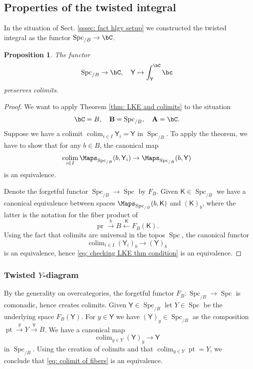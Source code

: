 \documentclass[10pt]{amsart}
\newcommand{\sssec}{\subsubsection}
\newtheorem{prop}[subsubsection]{Proposition}
\theoremstyle{remark}
\newcommand{\on}{\operatorname}
\newcommand{\Spc}{\on{Spc}}
\DeclareMathOperator{\pr}{pr}
\DeclareMathOperator{\colim}{colim}
\newcommand{\bA}{\mathbf{A}}
\newcommand{\bB}{\mathbf{B}}
\newcommand{\pt}{\on{pt}}
\newcommand{\sfY}{\mathsf{Y}}
\begin{document}
\subsection{Properties of the twisted integral}
In the situation of Sect. \ref{sssec: fact hlgy setup} we constructed the twisted integral as the functor $\Spc_{/B}\rightarrow \bC$.
\begin{prop}\label{prop: twfact colim}
    The functor 
    \begin{equation}\label{eq: twfact functor}
\Spc_{/B}\rightarrow \bC,\quad \sfY\mapsto \int^{\bC}_{\sfY}\bc
    \end{equation}
    preserves colimits.
\end{prop}
\begin{proof}
    We want to apply Theorem \ref{thm: LKE and colimits} to the situation
    \[\bC=B,\quad \bB=\Spc_{/B},\quad \bA=\bC.\]
    Suppose we have a colimit $\colim_{i\in I}\sfY_i =\sfY$ in $\Spc_{/B}$. To apply the theorem, we have to show that for any $b\in B$, the canonical map
    \begin{equation}\label{eq: checking LKE thm condition}
        \colim_{i\in I}\Maps_{\Spc_{/B}}(b,\sfY_i)\rightarrow \Maps_{\Spc_{/B}}(b,\sfY)
    \end{equation}
     is an equivalence. 
     \medskip

     Denote the forgetful functor $\Spc_{/B}\rightarrow \Spc$ by $F_B$.
     Given $\mathsf{K}\in \Spc_{/B}$ we have a canonical equivalence between spaces $\Maps_{\Spc_{/ B}}(b, \mathsf{K})$ and $(\mathsf{K})_b$, where the latter is the notation for the fiber product of
     \[\pr\xrightarrow{b} B\xleftarrow{\mathsf{K}}F_B(\mathsf{K}).\]
     Using the fact that colimits are universal in the topos $\Spc$, the canonical functor
     \[\colim_{i\in I}(\sfY_i)_b\rightarrow (\sfY)_b\]
     is an equivalence, hence \eqref{eq: checking LKE thm condition} is an equivalence. 
\end{proof}

\sssec{Twisted $Y$-diagram}
By the generality on overcategories, the forgetful functor $F_B:\Spc_{/B}\rightarrow \Spc$ is comonadic, hence creates colimits. Given $\sfY\in\Spc_{/B}$ let $Y\in\Spc$ be the underlying space $F_B(\sfY)$. For $y\in \sfY$ we have $(\sfY)_y\in\Spc_{/B}$ as the composition $\pt\xrightarrow{y}Y\xrightarrow{\sfY} B$.
We have a canonical map 
\begin{equation}\label{eq: colimit of fibers}
    \colim_{y\in Y}(\sfY)_y\rightarrow \sfY
\end{equation}
in $\Spc_{/B}$. Using the creation of colimits and that $\colim_{y\in Y}\pt=Y$, we conclude that \eqref{eq: colimit of fibers} is an equivalence.
\medskip
\end{document}
